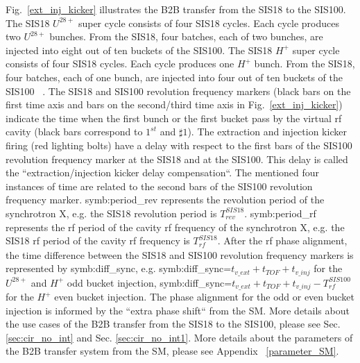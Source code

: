 Fig.~\ref{ext_inj_kicker} illustrates the B2B transfer from the SIS18 to the SIS100. The SIS18 $U^{28+}$ super cycle consists of four SIS18 cycles. Each cycle produces two $U^{28+}$ bunches. From the SIS18, four batches, each of two bunches, are injected into eight out of ten buckets of the SIS100. The SIS18 $H^{+}$ super cycle consists of four SIS18 cycles. Each cycle produces one $H^{+}$ bunch. From the SIS18, four batches, each of one bunch, are injected into four out of ten buckets of the SIS100 ~\cite{liebermann_fair_2013, liebermann_sis100_2013}. The SIS18 and SIS100 revolution frequency markers (black bars on the first time axis and bars on the second/third time axis in Fig.~\ref{ext_inj_kicker}) indicate the time when the first bunch or the first bucket pass by the virtual rf cavity (black bars correspond to $1^{st}$ and $\sharp1$). The extraction and injection kicker firing (red lighting bolts) have a delay with respect to the first bars of the SIS100 revolution frequency marker at the SIS18 and at the SIS100. This delay is called the ``extraction/injection kicker delay compensation``. The mentioned four instances of time are related to the second bars of the SIS100 revolution frequency marker. \gls{symb:period_rev} represents the revolution period of the synchrotron X, e.g. the SIS18 revolution period is $T_{\mathit{rev}}^{\mathit{SIS18}}$. \gls{symb:period_rf} represents the rf period of the cavity rf frequency of the synchrotron X, e.g. the SIS18 rf period of the cavity rf frequency is $T_{\mathit{rf}}^{\mathit{SIS18}}$. After the rf phase alignment, the time difference between the SIS18 and SIS100 revolution frequency markers is represented by \gls{symb:diff_sync}, e.g. \gls{symb:diff_sync}=$t_{\mathit{v\_ext}}+t_{\mathit{TOF}}+t_{\mathit{v\_inj}}$ for the $U^{28+}$ and $H^{+}$ odd bucket injection,  \gls{symb:diff_sync}=$t_{\mathit{v\_ext}}+t_{\mathit{TOF}}+t_{\mathit{v\_inj}}- T_{\mathit{rf}}^{\mathit{SIS100}}$ for the $H^{+}$ even bucket injection. The phase alignment for the odd or even bucket injection is informed by the ``extra phase shift`` from the SM. More details about the use cases of the B2B transfer from the SIS18 to the SIS100, please see Sec. \ref{sec:cir_no_int} and Sec. \ref{sec:cir_no_int1}. More details about the parameters of the B2B transfer system from the SM, please see Appendix ~\ref{parameter_SM}.  

